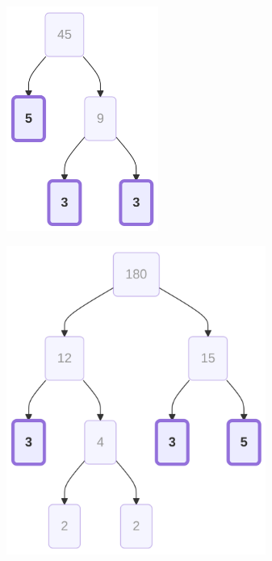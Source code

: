 \documentclass[
  letterpaper,
  DIV=11,
  numbers=noendperiod]{scrreprt}
\begin{document}
\begin{figure}

\begin{minipage}{0.50\linewidth}

\label{mermaid-diagram}
\includegraphics[width=1.96in,height=2.9in]{chapters/Unit_1/1.3_GCF_&_Simplifying_Fractions_files/figure-latex/mermaid-figure-18.png}

\end{minipage}%
%
\begin{minipage}{0.50\linewidth}

\label{mermaid-diagram}
\includegraphics[width=3.35in,height=3.98in]{chapters/Unit_1/1.3_GCF_&_Simplifying_Fractions_files/figure-latex/mermaid-figure-17.png}

\end{minipage}%

\end{figure}%
\end{document}
